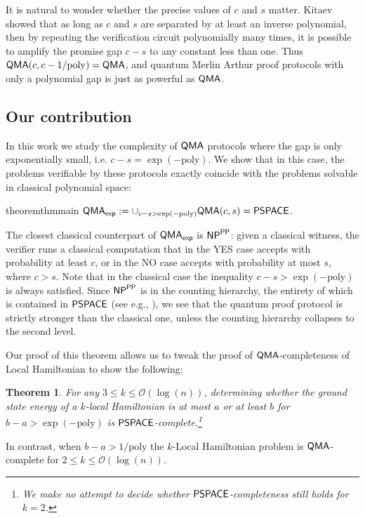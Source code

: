 \documentclass[11pt]{article}
\newtheorem{theorem}{Theorem}
\theoremstyle{definition}
\theoremstyle{remark}
\newcommand\QMA{{\sf{QMA}}}
\newcommand\PSPACE{{\sf{PSPACE}}}
\newcommand\PP{\sf{PP}}
\newcommand\NP{{\sf{NP}}}
\newcommand\QMAexp{{\sf{QMA}_{exp}}}
\newcommand{\poly}{\mathrm{poly}}
\begin{document}
It is natural to wonder whether the precise values of $c$ and $s$ matter. Kitaev showed \cite{ksv02} that as long as $c$ and $s$ are separated by at least an inverse polynomial, then by repeating the verification circuit polynomially many times, it is possible to amplify the promise gap $c-s$ to any constant less than one. Thus $\QMA(c,c-1/\poly) = \QMA$, and quantum Merlin Arthur proof protocols with only a polynomial gap is just as powerful as $\QMA$.

\subsection{Our contribution}

In this work we study the complexity of $\QMA$ protocols where the gap is only exponentially small, i.e. $c-s = \exp(-\poly)$. We show that in this case, the problems verifiable by these protocols exactly coincide with the problems solvable in classical polynomial space:

\begin{restatable}{theorem}{thmmain}
\label{thm:main}
$\QMAexp := \cup_{c-s > \exp(-\poly)}\QMA(c,s) = \PSPACE$.
\end{restatable}

The closest classical counterpart of $\QMAexp$ is $\NP^{\PP}$: given a classical witness, the verifier runs a classical computation that in the YES case accepts with probability at least $c$, or in the NO case accepts with probability at most $s$, where $c>s$. Note that in the classical case the inequality $c - s > \exp(-\poly)$ is always satisfied. Since $\NP^{\PP}$ is in the counting hierarchy, the entirety of which is contained in $\PSPACE$ (see e.g., \cite{allenderwagner}), we see that the quantum proof protocol is strictly stronger than the classical one, unless the counting hierarchy collapses to the second level.

Our proof of this theorem allows us to tweak the proof of $\QMA$-completeness of Local Hamiltonian \cite{ksv02,kr03} to show the following:

\begin{theorem}
\label{thm:lh}
For any $3 \le k \le \mathcal{O}(\log(n))$, determining whether the ground state energy of a $k$-local Hamiltonian is at most $a$ or at least $b$ for $b-a > \exp(-\poly)$ is $\PSPACE$-complete.\footnote{We make no attempt to decide whether $\PSPACE$-completeness still holds for $k = 2$.}
\end{theorem}
In contrast, when $b-a > 1/\poly$ the $k$-Local Hamiltonian problem is $\QMA$-complete \cite{ksv02,kr03} for $2 \le k \le \mathcal{O}(\log(n))$.
\end{document}
